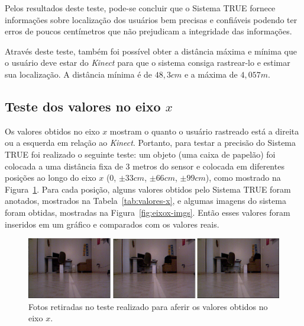 	Pelos resultados deste teste, pode-se concluir que o Sistema TRUE fornece informações sobre localização dos usuários bem precisas e confiáveis podendo ter erros de poucos centímetros que não prejudicam a integridade das informações. 

	Através deste teste, também foi possível obter a distância máxima e mínima que o usuário deve estar do \textit{Kinect} para que o sistema consiga rastrear-lo e estimar sua localização. A distância mínima é de $\displaystyle 48,3 cm$ e a máxima de $\displaystyle 4,057 m$.

\subsection{Teste dos valores no eixo $\displaystyle x$}

	Os valores obtidos no eixo $\displaystyle x$ mostram o quanto o usuário rastreado está a direita ou a esquerda em relação ao \textit{Kinect}. Portanto, para testar a precisão do Sistema TRUE foi realizado o seguinte teste: um objeto (uma caixa de papelão) foi colocada a uma distância fixa de 3 metros do sensor e colocada em diferentes posições ao longo do eixo $\displaystyle x$ (0, $\displaystyle \pm33 cm$, $\displaystyle \pm66 cm$, $\displaystyle \pm99 cm$), como mostrado na Figura~\ref{fig:teste-eixox}. Para cada posição, alguns valores obtidos pelo Sistema TRUE foram anotados, mostrados na Tabela~\ref{tab:valores-x}, e algumas imagens do sistema foram obtidas, mostradas na Figura~\ref{fig:eixox-imgs}. Então esses valores foram inseridos em um gráfico e comparados com os valores reais.

	\begin{figure}[htb]
		\begin{center}
			\includegraphics[scale=0.45]{figuras/5.Testes/teste-eixox.png}
		\end{center}
		\caption{Fotos retiradas no teste realizado para aferir os valores obtidos no eixo $\displaystyle x$.}
		\label{fig:teste-eixox}
	\end{figure}

